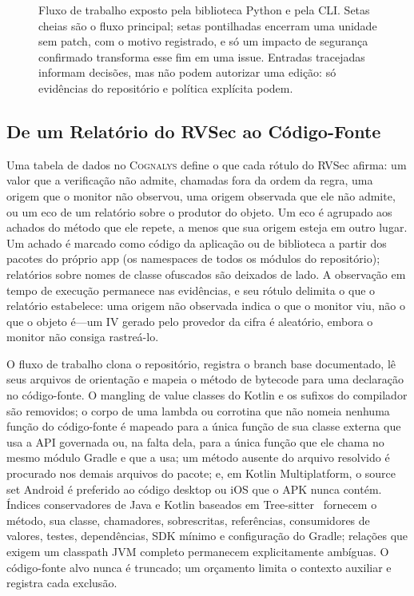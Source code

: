 \documentclass[conference]{IEEEtran}
\newcommand{\system}{\textsc{Cognalys}}
\begin{document}
\begin{figure}[t]
{
}
\caption{Fluxo de trabalho exposto pela biblioteca Python e pela CLI. Setas
cheias são o fluxo principal; setas pontilhadas encerram uma unidade sem patch,
com o motivo registrado, e só um impacto de segurança confirmado transforma esse
fim em uma issue. Entradas tracejadas informam decisões, mas não podem autorizar
uma edição: só evidências do repositório e política explícita podem.}
\label{fig:pipeline}
\end{figure}

\subsection{De um Relatório do RVSec ao Código-Fonte}

Uma tabela de dados no \system{} define o que cada rótulo do RVSec afirma: um
valor que a verificação não admite, chamadas fora da ordem da regra, uma origem
que o monitor não observou, uma origem observada que ele não admite, ou um eco
de um relatório sobre o produtor do objeto. Um eco é agrupado aos achados do
método que ele repete, a menos que sua origem esteja em outro lugar. Um achado
é marcado como código da aplicação ou de biblioteca a partir dos pacotes do
próprio app (os namespaces de todos os módulos do repositório); relatórios
sobre nomes de classe ofuscados são deixados de lado. A observação em tempo de execução permanece nas evidências, e
seu rótulo delimita o que o relatório estabelece: uma origem não observada
indica o que o monitor viu, não o que o objeto é---um IV gerado pelo provedor
da cifra é aleatório, embora o monitor não consiga rastreá-lo.

O fluxo de trabalho clona o repositório, registra o branch base documentado, lê
seus arquivos de orientação e mapeia o método de bytecode para uma declaração
no código-fonte. O mangling de value classes do Kotlin e os sufixos do
compilador são removidos; o corpo de uma lambda ou corrotina que não nomeia
nenhuma função do código-fonte é mapeado para a única função de sua classe
externa que usa a API governada ou, na falta dela, para a única função que ele
chama no mesmo módulo Gradle e que a usa; um método ausente do arquivo
resolvido é procurado nos demais arquivos do pacote; e, em Kotlin
Multiplatform, o source set Android é preferido ao código desktop ou iOS que o
APK nunca contém. Índices conservadores de Java e Kotlin baseados em
Tree-sitter~\cite{treesitter} fornecem o método, sua classe, chamadores,
sobrescritas, referências, consumidores de valores, testes, dependências, SDK
mínimo e configuração do Gradle; relações que exigem um classpath JVM completo
permanecem explicitamente ambíguas. O código-fonte alvo nunca é truncado; um
orçamento limita o contexto auxiliar e registra cada exclusão.
\end{document}
